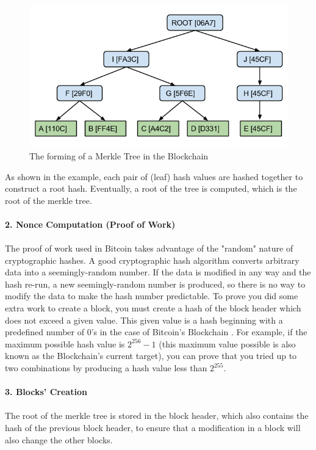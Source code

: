 \begin{figure}[htp]
    \includegraphics[scale=0.54]{merkle}
    \hspace*{-2cm}
    \caption{The forming of a Merkle Tree in the Blockchain}
\end{figure}
As shown in the example, each pair of (leaf) hash values are hashed together to construct a root hash. Eventually, a root of the tree is computed, which is the root of the merkle tree.\\
\\ 
\textbf{\large{2. Nonce Computation (Proof of Work) \cite{merkle2}}}\\ 
\\ 
The proof of work used in Bitcoin takes advantage of the "random" nature of cryptographic hashes. A good cryptographic hash algorithm converts arbitrary data into a seemingly-random number. If the data is modified in any way and the hash re-run, a new seemingly-random number is produced, so there is no way to modify the data to make the hash number predictable. To prove you did some extra work to create a block, you must create a hash of the block header which does not exceed a given value. This given value is a hash beginning with a predefined number of 0's in the case of Bitcoin's Blockchain . For example, if the maximum possible hash value is $2^{256} -1$ (this maximum value possible is also known as the Blockchain's current target), you can prove that you tried up to two combinations by producing a hash value less than $2^{255}$.\\
\\
\textbf{\large{3. Blocks' Creation\cite{merkle2}}}\\
\\
The root of the merkle tree is stored in the block header, which also contains the hash of the previous block header, to ensure that a modification in a block will also change the other blocks.

